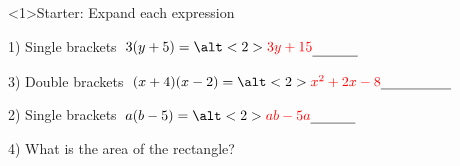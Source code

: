 \documentclass{beamer}
\newcommand{\ablank}[1]{%
  \alt<2>{\textcolor{red}{#1}}{\underline{\phantom{#1}}}%
}
\newcommand{\ashow}[1]{\uncover<2->{\textcolor{red}{\small #1}}}
\newcommand{\ashowq}[1]{\alt<2->{\textcolor{red}{\small #1}}{?}}
\begin{document}
\begin{frame}<1>{Starter: Expand each expression}
\begin{minipage}[t]{0.48\textwidth}
  \begin{block}{1) Single brackets}
    \Large \(\;3(y+5)=\ablank{3y+15}\)
  \end{block}
  \vspace{0.5em}
  \begin{block}{3) Double brackets}
    \Large \(\;(x+4)(x-2)=\ablank{x^2+2x-8}\)
  \end{block}
\end{minipage}\hfill
\begin{minipage}[t]{0.48\textwidth}
  \begin{block}{2) Single brackets}
    \Large \(\; a(b-5)=\ablank{ab-5a}\)
  \end{block}
  \vspace{0.5em}
  \begin{block}{4) What is the area of the rectangle?}
    \par\vspace{0.5em}
    \ashow{Area = \(x(f+6)\)}
  \end{block}
\end{minipage}
\end{frame}
\end{document}
